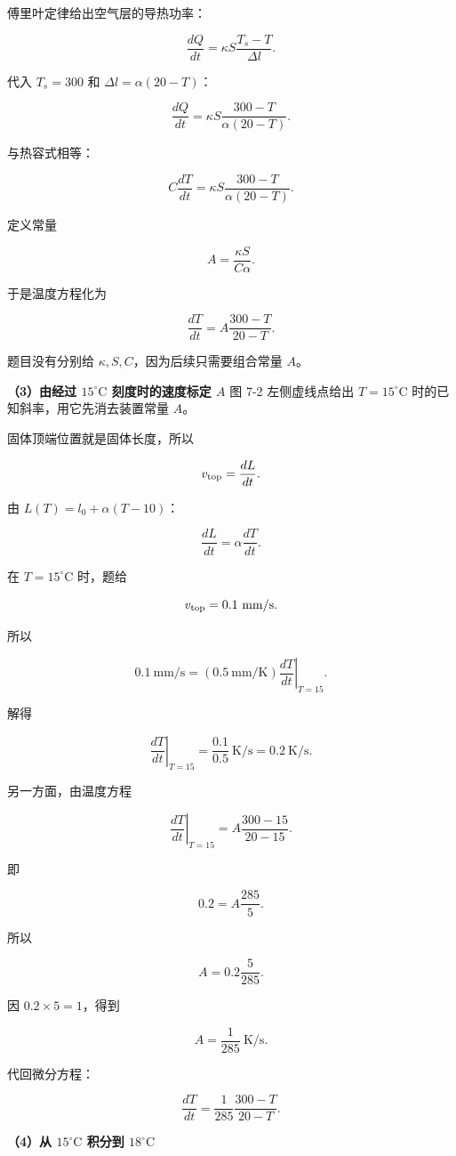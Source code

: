 \documentclass[12pt,a4paper,UTF8]{ctexart}
\begin{document}
傅里叶定律给出空气层的导热功率：

\[\frac{dQ}{dt}=\kappa S\frac{T_s-T}{\Delta l}.\]

代入 \(T_s=300\) 和 \(\Delta l=\alpha(20-T)\)：

\[\frac{dQ}{dt}=\kappa S
\frac{300-T}{\alpha(20-T)}.\]

与热容式相等：

\[C\frac{dT}{dt}=\kappa S
\frac{300-T}{\alpha(20-T)}.\]

定义常量

\[A=\frac{\kappa S}{C\alpha}.\]

于是温度方程化为

\[\boxed{
\frac{dT}{dt}=A\frac{300-T}{20-T}
}.\]

题目没有分别给 \(\kappa,S,C\)，因为后续只需要组合常量 \(A\)。

\textbf{（3）由经过 \(15^\circ\mathrm C\) 刻度时的速度标定 \(A\)} 图 7-2
左侧虚线点给出 \(T=15^\circ\mathrm C\) 时的已知斜率，用它先消去装置常量
\(A\)。

固体顶端位置就是固体长度，所以

\[v_{\rm top}=\frac{dL}{dt}.\]

由 \(L(T)=l_0+\alpha(T-10)\)：

\[\frac{dL}{dt}=\alpha\frac{dT}{dt}.\]

在 \(T=15^\circ\mathrm C\) 时，题给

\[v_{\rm top}=0.1\ \mathrm{mm/s}.\]

所以

\[0.1\ \mathrm{mm/s}
=(0.5\ \mathrm{mm/K})
\left.\frac{dT}{dt}\right|_{T=15}.\]

解得

\[\left.\frac{dT}{dt}\right|_{T=15}
=\frac{0.1}{0.5}\ \mathrm{K/s}
=0.2\ \mathrm{K/s}.\]

另一方面，由温度方程

\[\left.\frac{dT}{dt}\right|_{T=15}
=A\frac{300-15}{20-15}.\]

即

\[0.2=A\frac{285}{5}.\]

所以

\[A=0.2\frac5{285}.\]

因 \(0.2\times5=1\)，得到

\[\boxed{A=\frac1{285}\ \mathrm{K/s}}.\]

代回微分方程：

\[\boxed{
\frac{dT}{dt}=\frac1{285}\frac{300-T}{20-T}
}.\]

\textbf{（4）从 \(15^\circ\mathrm C\) 积分到 \(18^\circ\mathrm C\)}
\end{document}

